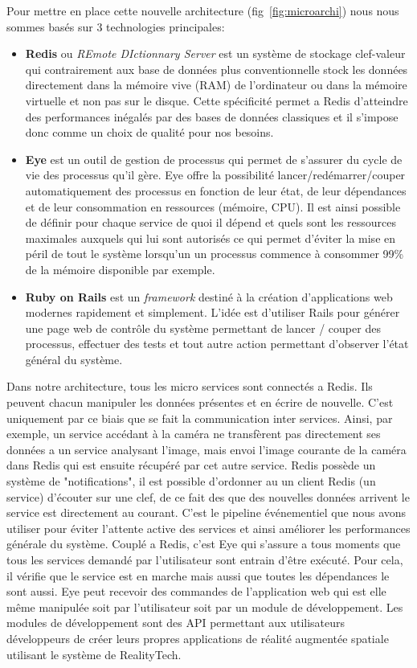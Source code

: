 Pour mettre en place cette nouvelle architecture (fig~\ref{fig:microarchi}) nous nous sommes basés sur 3 technologies principales:
\begin{itemize}
\item \textbf{Redis}\cite{redis} ou \emph{REmote DIctionnary Server} est un système de stockage clef-valeur qui contrairement aux base de données plus conventionnelle stock les données directement dans la mémoire vive (RAM) de l'ordinateur ou dans la mémoire virtuelle
 et non pas sur le disque. Cette spécificité permet a Redis d'atteindre des performances inégalés par des bases de données classiques et il s'impose donc comme un choix de qualité pour nos besoins.
\item \textbf{Eye}\cite{eye} est un outil de gestion de processus qui permet de s'assurer du cycle de vie des processus qu'il gère. Eye offre la possibilité lancer/redémarrer/couper automatiquement des processus en fonction de leur état, de leur dépendances et de leur consommation en ressources (mémoire, CPU). Il est ainsi possible de définir pour chaque service de quoi il dépend et quels sont les ressources maximales auxquels qui lui sont autorisés ce qui permet d'éviter la mise en péril de tout le système lorsqu'un un processus commence à consommer 99\% de la mémoire disponible par exemple.
\item \textbf{Ruby on Rails}\cite{rubyrails} est un \emph{framework} destiné à la création d'applications web modernes rapidement et simplement. L'idée est d'utiliser Rails pour générer une page web de contrôle du système permettant de lancer / couper des processus, effectuer des tests et tout autre action permettant d'observer l'état général du système.
\end{itemize}

Dans notre architecture, tous les micro services sont connectés a Redis. Ils peuvent chacun manipuler les données présentes et en écrire de nouvelle. C'est uniquement par ce biais que se fait la communication inter services. Ainsi, par exemple, un service accédant à la caméra ne transfèrent pas directement ses données a un service analysant l'image, mais envoi l'image courante de la caméra dans Redis qui est ensuite récupéré par cet autre service. Redis possède un système de "notifications", il est possible d'ordonner au un client Redis (un service) d'écouter sur une clef, de ce fait des que des nouvelles données arrivent le service est directement au courant. C'est le pipeline événementiel que nous avons utiliser pour éviter l'attente active des services et ainsi améliorer les performances générale du système.
Couplé a Redis, c'est Eye qui s'assure a tous moments que tous les services demandé par l'utilisateur sont entrain d'être exécuté. Pour cela, il vérifie que le service est en marche mais aussi que toutes les dépendances le sont aussi. Eye peut recevoir des commandes de l'application web qui est elle même manipulée soit par l'utilisateur soit par un module de développement.
Les modules de développement sont des API permettant aux utilisateurs développeurs de créer leurs propres applications de réalité augmentée spatiale utilisant le système de RealityTech.